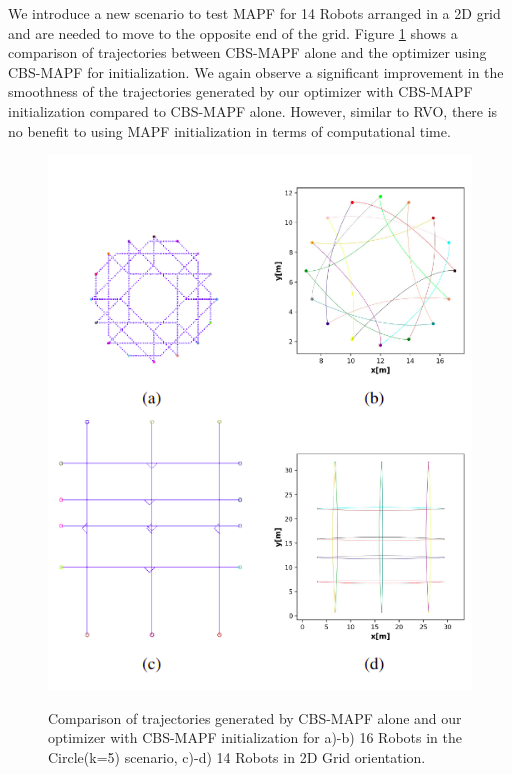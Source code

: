 We introduce a new scenario to test MAPF for 14 Robots arranged in a 2D grid and are needed to move to the opposite end of the grid. Figure \ref{fig:MAPF+opti_grid} shows a comparison of trajectories between CBS-MAPF alone and the optimizer using CBS-MAPF for initialization. We again observe a significant improvement in the smoothness of the trajectories generated by our optimizer with CBS-MAPF initialization compared to CBS-MAPF alone. However, similar to RVO, there is no benefit to using MAPF initialization in terms of computational time. 

\begin{figure}[H]
    \centering
    {\includegraphics[scale=0.6]{figures/appendix/mapf_init.png}} 
    \caption[Appendix: Trajectories using MAPF + multi-robot optimizer]{Comparison of trajectories generated by CBS-MAPF alone and our optimizer with CBS-MAPF initialization for a)-b) 16 Robots in the Circle(k=5) scenario, c)-d) 14 Robots in 2D Grid orientation.}
    \label{fig:MAPF+opti_grid}
\end{figure}